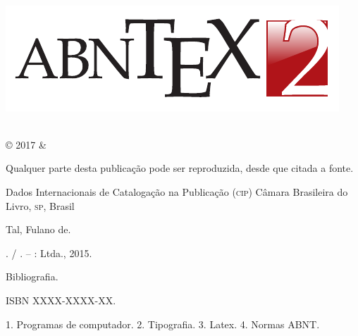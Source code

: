 \documentclass[
	10pt,				%
	openright,			%
	twoside,			%
	a5paper,			%
	english,			%
	french,				%
	brazil,				%
	sumario=tradicional
]{abntex2}
\begin{document}
\begin{titlingpage}

\phantom{xxx}
\vspace{0.5cm}
\huge
\raggedright
\imprimirautor\\
\vspace{2.5cm}
\huge 
{\raggedleft
\includegraphics[scale=0.9]{abntex2-modelo-img-marca.pdf}\\[1cm]
\textit{\textcolor{blue}{\imprimirtitulo}}\\[1cm]
}
\centering 
\vfill
\Large
\imprimirinstituicao

\clearpage
\ABNTEXfontereduzida
© 2017 \imprimirautor \space \& \imprimirinstituicao

Qualquer parte desta publicação pode ser reproduzida, desde que citada a fonte.

\vspace*{\fill}

\begin{center}
Dados Internacionais de Catalogação na Publicação (\textsc{cip})
Câmara Brasileira do Livro, \textsc{sp}, Brasil
\end{center}

\begin{mdframed}
\noindent Tal, Fulano de.

\imprimirtitulo. / \imprimirautor. -- \imprimirlocal: \imprimirinstituicao
Ltda., 2015.

\medskip

Bibliografia.

ISBN XXXX-XXXX-XX.

\medskip

1. Programas de computador. 2. Tipografia. 3. Latex. 4. Normas ABNT.

\end{mdframed}

\end{titlingpage}
\end{document}
